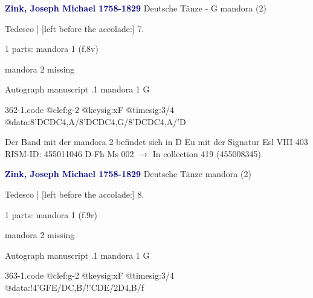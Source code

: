\documentclass[twocolumn]{book}
\begin{document}
\newline \par \vspace{7pt} \textcolor{darkblue}{\textbf{Zink, Joseph Michael  1758-1829}}
\newline Deutsche Tänze - G
\newline mandora (2)
\newline \begin{itshape}[f.8v, at left:] Tedesco | [left before the accolade:] 7.\end{itshape} 
\newline \textcolor{darkblue}{}  1 parts: mandora 1  (f.8v)
\newline \begin{small} mandora 2 missing\end{small} 
\newline Autograph manuscript
.1  mandora 1  G  
\begin{filecontents*}{362-1.code}
@clef:g-2
@keysig:xF
@timesig:3/4
@data:8'DCDC4,A/8'DCDC4,G/8'DCDC4,A/'D
\end{filecontents*}
\newline
%

\newline Der Band mit der mandora 2 befindet sich in D Eu mit der Signatur Esl VIII 403
\newline RISM-ID: 455011046
\newline D-Fh  Ms 002
\newline $\rightarrow$ In collection 419 (455008345)
      
\newline \par \vspace{7pt} \textcolor{darkblue}{\textbf{Zink, Joseph Michael  1758-1829}}
\newline Deutsche Tänze
\newline mandora (2)
\newline \begin{itshape}[f.9v, at left:] Tedesco | [left before the accolade:] 8.\end{itshape} 
\newline \textcolor{darkblue}{}  1 parts: mandora 1  (f.9r)
\newline \begin{small} mandora 2 missing\end{small} 
\newline Autograph manuscript
.1  mandora 1  G  
\begin{filecontents*}{363-1.code}
@clef:g-2
@keysig:xF
@timesig:3/4
@data:!4'GFE/DC,B/!'CDE/2D4,B/f
\end{filecontents*}
\newline
%
\end{document}
